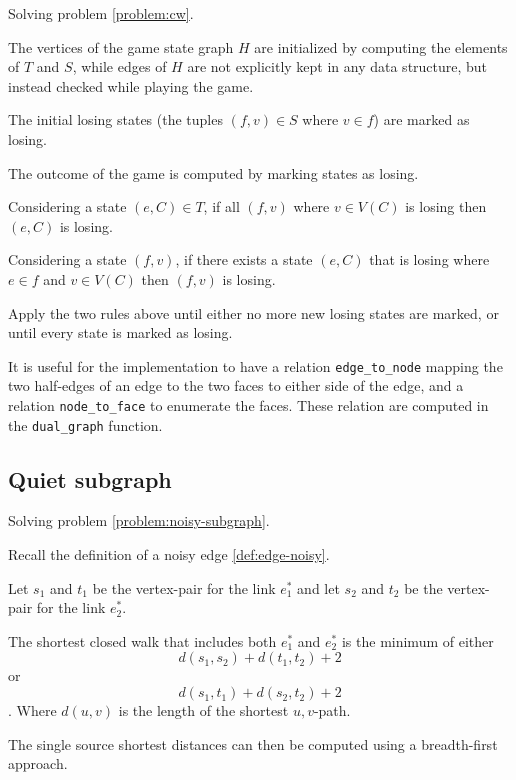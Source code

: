 \documentclass{article}
\begin{document}
		Solving problem \ref{problem:cw}.

		The vertices of the game state graph $H$ are initialized by computing the elements of $T$ and $S$, while edges of $H$ are not explicitly kept in any data structure, but instead checked while playing the game.

		The initial losing states (the tuples $(f,v) \in S$ where $v \in f$) are marked as losing.

		The outcome of the game is computed by marking states as losing.
		
		Considering a state $(e, C) \in T$, if all $(f, v)$ where $v \in V(C)$ is losing then $(e, C)$ is losing.

		Considering a state $(f, v)$, if there exists a state $(e, C)$ that is losing where $e \in f$ and $v \in V(C)$ then $(f, v)$ is losing.

		Apply the two rules above until either no more new losing states are marked, or until every state is marked as losing.

		It is useful for the implementation to have a relation \texttt{edge_to_node} mapping the two half-edges of an edge to the two faces to either side of the edge, and a relation \texttt{node_to_face} to enumerate the faces. These relation are computed in the \texttt{dual_graph} function.


		\subsection{Quiet subgraph}

			Solving problem \ref{problem:noisy-subgraph}.

			Recall the definition of a noisy edge \ref{def:edge-noisy}.

			Let $s_1$ and $t_1$ be the vertex-pair for the link $e_1^*$ and let $s_2$ and $t_2$ be the vertex-pair for the link $e_2^*$.

			\begin{claim}
				The shortest closed walk that includes both $e_1^*$ and $e_2^*$ is the minimum of either $$d(s_1, s_2) + d(t_1, t_2) + 2$$ or $$d(s_1, t_1) + d(s_2, t_2) + 2$$. Where $d(u, v)$ is the length of the shortest $u,v$-path.
			\end{claim}

			The single source shortest distances can then be computed using a breadth-first approach.
\end{document}
